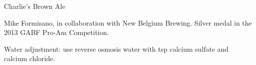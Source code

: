 \begin{recipe}{Charlie's Brown Ale}

\begin{aboutblock}
Mike Formisano, in collaboration with New Belgium Brewing. Silver medal in the
2013 GABF Pro-Am Competition. \sourceaha
\end{aboutblock}


\begin{methodandtiming}

\begin{mashsteps}
\end{mashsteps}

\begin{fermentationsteps}
\end{fermentationsteps}

\begin{directions}
Water adjustment: use reverse osmosis water with  tsp calcium sulfate
and  calcium chloride.
\end{directions}

\end{methodandtiming}

\recipebreak

\begin{ingredientsblock}

\begin{malts}
\end{malts}

\begin{hops}
\end{hops}


\end{ingredientsblock}

\end{recipe}

